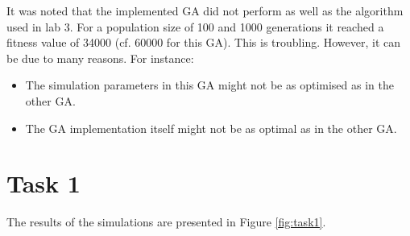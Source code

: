 \documentclass[]{article}
\begin{document}
It was noted that the implemented GA did not perform as well as the algorithm used in lab 3.
For a population size of 100 and 1000 generations it reached a fitness value of 34000 (cf. 60000 for this GA).
This is troubling.
However, it can be due to many reasons.
For instance:
\begin{itemize}
  \item The simulation parameters in this GA might not be as optimised as in the other GA.
  \item The GA implementation itself might not be as optimal as in the other GA.
\end{itemize}


\section*{Task 1}
The results of the simulations are presented in Figure \ref{fig:task1}.
\end{document}
